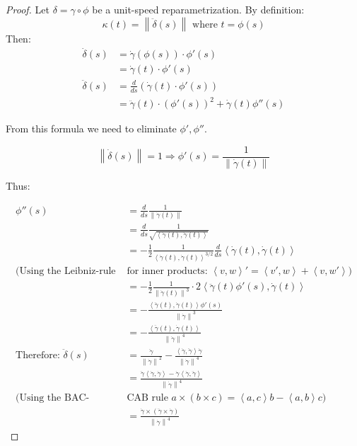 \documentclass[a4paper,11pt,notitlepage,fullpage]{paper}
\theoremstyle{plain}
\theoremstyle{definition}
\begin{document}
\begin{proof} Let $\delta = \gamma \circ \phi$ be a unit-speed reparametrization. By definition:
\begin{equation*}
\kappa(t) = \left\|\ddot\delta(s)\right\|\text{ where }t = \phi(s)
\end{equation*}
Then:
\begin{align*}
\dot\delta(s) &= \dot\gamma\left(\phi(s)\right) \cdot \phi'(s) \\
			  &= \dot\gamma(t) \cdot \phi'(s) \\
\ddot\delta(s) &= \frac{d}{ds} \left(\dot\gamma(t) \cdot \phi'(s)\right) \\
			   &= \ddot\gamma(t) \cdot \left(\phi'(s)\right)^2 + \dot\gamma(t)\phi''(s)
\end{align*}

From this formula we need to eliminate $\phi', \phi''$.

\begin{equation*}
\left\|\dot\delta(s)\right\| = 1 \Rightarrow \phi'(s) = \frac{1}{\left\|\dot\gamma(t)\right\|}
\end{equation*}

Thus:

\begin{align*}
\phi''(s) &= \frac{d}{ds} \frac{1}{\left\|\dot\gamma(t)\right\|} \\
&= \frac{d}{ds} \frac{1}{\sqrt{\left\langle\dot\gamma(t), \dot\gamma(t)\right\rangle}} \\
&= - \frac{1}{2} \frac{1}{\left\langle\dot\gamma(t), \dot\gamma(t)\right\rangle^{3/2}} \frac{d}{ds} \left\langle\dot\gamma(t), \dot\gamma(t)\right\rangle \\
\Big(\text{Using the Leibniz-rule }&\text{for inner products: } \left\langle v,w\right\rangle' = \left\langle v',w\right\rangle + \left\langle v,w'\right\rangle \Big) \\
&= - \frac{1}{2} \frac{1}{\left\|\dot\gamma(t)\right\|^3} \cdot 2 \left\langle\ddot\gamma(t) \phi'(s), \dot\gamma(t)\right\rangle \\
&= - \frac{\left\langle\ddot\gamma(t), \dot\gamma(t)\right\rangle \phi'(s)}{\left\|\dot\gamma\right\|^3} \\
&= - \frac{\left\langle\ddot\gamma(t), \dot\gamma(t)\right\rangle}{\left\|\dot\gamma\right\|^4} \\
\text{Therefore: }\ddot\delta(s) &= \frac{\ddot\gamma}{\left\|\dot\gamma\right\|^2} - \frac{\left\langle\dot\gamma, \ddot\gamma\right\rangle \dot\gamma}{\left\|\dot\gamma\right\|^4} \\
&= \frac{\ddot\gamma \left\langle\dot\gamma, \dot\gamma\right\rangle - \dot\gamma\left\langle\dot\gamma, \ddot\gamma\right\rangle}{\left\|\dot\gamma\right\|^4} \\
\Big(\text{Using the BAC-}& \text{CAB rule } a \times (b\times c) = \left\langle a,c\right\rangle b - \left\langle a,b\right\rangle c \Big) \\
&= \frac{\dot\gamma \times (\ddot\gamma \times \dot\gamma)}{\left\|\dot\gamma\right\|^4}
\end{align*}


\end{proof}
\end{document}
